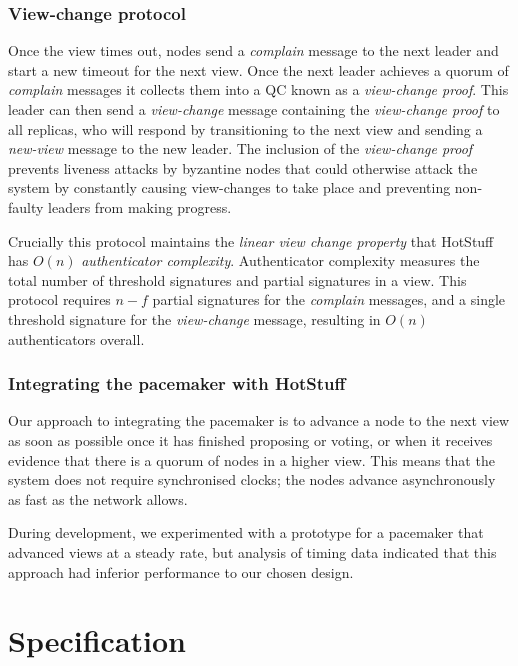 \subsubsection{View-change protocol} \label{viewchange}

Once the view times out, nodes send a \textit{complain} message to the next leader and start a new timeout for the next view. Once the next leader achieves a quorum of \textit{complain} messages it collects them into a QC known as a \textit{view-change proof}. This leader can then send a \textit{view-change} message containing the \textit{view-change proof} to all replicas, who will respond by transitioning to the next view and sending a \textit{new-view} message to the new leader. The inclusion of the \textit{view-change proof} prevents liveness attacks by byzantine nodes that could otherwise attack the system by constantly causing view-changes to take place and preventing non-faulty leaders from making progress.

Crucially this protocol maintains the \textit{linear view change property} that HotStuff has $O(n)$ \textit{authenticator complexity}. Authenticator complexity measures the total number of threshold signatures and partial signatures in a view. This protocol requires $n - f$ partial signatures for the \textit{complain} messages, and a single threshold signature for the \textit{view-change} message, resulting in $O(n)$ authenticators overall.

\subsubsection{Integrating the pacemaker with HotStuff}

Our approach to integrating the pacemaker is to advance a node to the next view as soon as possible once it has finished proposing or voting, or when it receives evidence that there is a quorum of nodes in a higher view. This means that the system does not require synchronised clocks; the nodes advance asynchronously as fast as the network allows.

During development, we experimented with a prototype for a pacemaker that advanced views at a steady rate, but analysis of timing data indicated that this approach had inferior performance to our chosen design.

\section{Specification} \label{spec}

